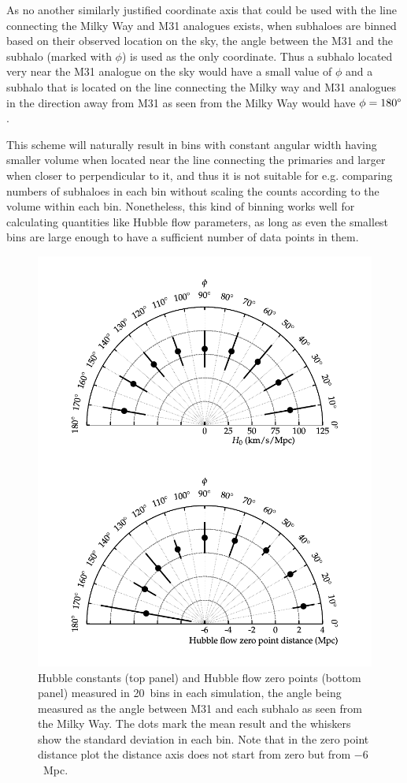 \documentclass[english, twoside]{HYgradu}
\begin{document}
As no another similarly justified coordinate axis that could be used with the line connecting the Milky Way and M31 analogues exists, when subhaloes are binned based on their observed location on the sky, the angle between the M31 and the subhalo (marked with $\phi$) is used as the only coordinate. Thus a subhalo located very near the M31 analogue on the sky would have a small value of $\phi$ and a subhalo that is located on the line connecting the Milky way and M31 analogues in the direction away from M31 as seen from the Milky Way would have $\phi = 180 \degree$.

This scheme will naturally result in bins with constant angular width having smaller volume when located near the line connecting the primaries and larger when closer to perpendicular to it, and thus it is not suitable for e.g. comparing numbers of subhaloes in each bin without scaling the counts according to the volume within each bin. Nonetheless, this kind of binning works well for calculating quantities like Hubble flow parameters, as long as even the smallest bins are large enough to have a sufficient number of data points in them.

\begin{figure}
    \centering
    \includegraphics{kuvat/directionalHF.pdf}
    \caption{Hubble constants (top panel) and Hubble flow zero points (bottom panel) measured in 20\textdegree\ bins in each simulation, the angle being measured as the angle between M31 and each subhalo as seen from the Milky Way. The dots mark the mean result and the whiskers show the standard deviation in each bin. Note that in the zero point distance plot the distance axis does not start from zero but from $-6$~Mpc.}\label{fig:directionalHF}
\end{figure}
\end{document}
